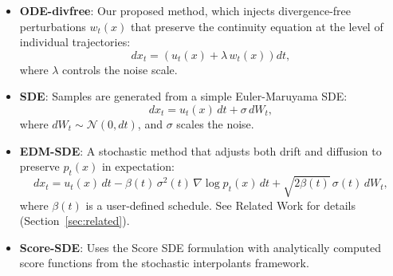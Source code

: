 \documentclass{article}
\begin{document}
\begin{itemize}
  \item \textbf{ODE-divfree}: Our proposed method, which injects divergence-free perturbations \( w_t(x) \) that preserve the continuity equation at the level of individual trajectories:
  \[
  dx_t = \left(u_t(x) + \lambda\,w_t(x)\right) dt,
  \]
  where \( \lambda \) controls the noise scale.
  \item \textbf{SDE}: Samples are generated from a simple Euler-Maruyama SDE:
  \[
  dx_t = u_t(x)\,dt + \sigma\,dW_t,
  \]
  where \( dW_t \sim \mathcal{N}(0, dt) \), and \(\sigma\) scales the noise.
  \item \textbf{EDM-SDE}: A stochastic method that adjusts both drift and diffusion to preserve \(p_t(x)\) in expectation:
  \[
  dx_t = u_t(x)\,dt - \beta(t)\,\sigma^2(t)\,\nabla \log p_t(x)\,dt + \sqrt{2\beta(t)}\,\sigma(t)\,dW_t,
  \]
  where \(\beta(t)\) is a user-defined schedule. See Related Work for details (Section~\ref{sec:related}).
  \item \textbf{Score-SDE}: Uses the Score SDE formulation with analytically computed score functions from the stochastic interpolants framework.
\end{itemize}
\end{document}
